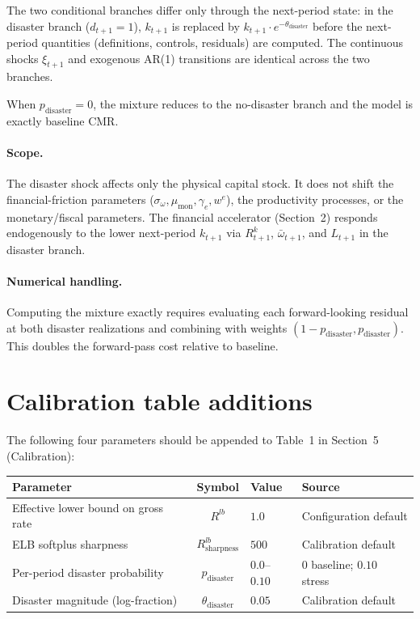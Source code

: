 The two conditional branches differ only through the next-period
state: in the disaster branch ($d_{t+1} = 1$), $k_{t+1}$ is replaced by
$k_{t+1} \cdot e^{-\theta_{\text{disaster}}}$ before the next-period
quantities (definitions, controls, residuals) are computed. The
continuous shocks $\xi_{t+1}$ and exogenous AR(1) transitions are
identical across the two branches.

When $p_{\text{disaster}} = 0$, the mixture reduces to the no-disaster
branch and the model is exactly baseline CMR.

\paragraph{Scope.}
The disaster shock affects only the physical capital stock. It does not
shift the financial-friction parameters ($\sigma_\omega, \mu_{\text{mon}},
\gamma_e, w^e$), the productivity processes, or the monetary/fiscal
parameters. The financial accelerator (Section~2) responds endogenously
to the lower next-period $k_{t+1}$ via $R^k_{t+1}$, $\bar\omega_{t+1}$,
and $L_{t+1}$ in the disaster branch.

\paragraph{Numerical handling.}
Computing the mixture exactly requires evaluating each forward-looking
residual at both disaster realizations and combining with weights
$(1 - p_{\text{disaster}}, p_{\text{disaster}})$. This doubles the
forward-pass cost relative to baseline.


\section*{Calibration table additions}

The following four parameters should be appended to Table~1 in
Section~5 (Calibration):

\begin{center}
\begin{tabular}{lcll}
\toprule
Parameter & Symbol & Value & Source \\
\midrule
Effective lower bound on gross rate & $R^{lb}$ & $1.0$ & Configuration default \\
ELB softplus sharpness & $R^{lb}_{\text{sharpness}}$ & $500$ & Calibration default \\
Per-period disaster probability & $p_{\text{disaster}}$ & $0.0$--$0.10$ & $0$ baseline; $0.10$ stress \\
Disaster magnitude (log-fraction) & $\theta_{\text{disaster}}$ & $0.05$ & Calibration default \\
\bottomrule
\end{tabular}
\end{center}

